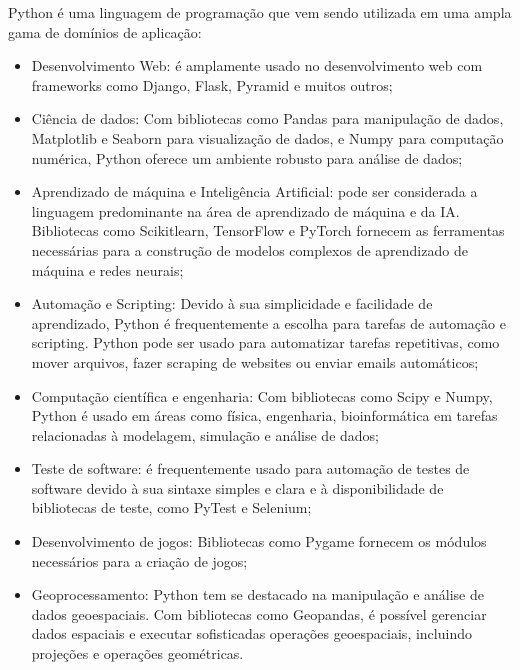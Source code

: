 \documentclass[letterpaper,10pt,english]{jupyterBook}
\begin{document}
\sphinxAtStartPar
{}

\sphinxAtStartPar
Python é uma linguagem de programação que vem sendo utilizada em uma ampla gama de domínios de aplicação:
\begin{itemize}
\item {} 
\sphinxAtStartPar
Desenvolvimento Web: é amplamente usado no desenvolvimento web com frameworks como Django, Flask, Pyramid e muitos outros;

\item {} 
\sphinxAtStartPar
Ciência de dados: Com bibliotecas como Pandas para manipulação de dados, Matplotlib e Seaborn para visualização de dados, e Numpy para computação numérica, Python oferece um ambiente robusto para análise de dados;

\item {} 
\sphinxAtStartPar
Aprendizado de máquina e Inteligência Artificial: pode ser considerada a linguagem predominante na área de aprendizado de máquina e da IA. Bibliotecas como Scikit\sphinxhyphen{}learn, TensorFlow e PyTorch fornecem as ferramentas necessárias para a construção de modelos complexos de aprendizado de máquina e redes neurais;

\item {} 
\sphinxAtStartPar
Automação e Scripting: Devido à sua simplicidade e facilidade de aprendizado, Python é frequentemente a escolha para tarefas de automação e scripting. Python pode ser usado para automatizar tarefas repetitivas, como mover arquivos, fazer scraping de websites ou enviar e\sphinxhyphen{}mails automáticos;

\item {} 
\sphinxAtStartPar
Computação científica e engenharia: Com bibliotecas como Scipy e Numpy, Python é usado em áreas como física, engenharia, bioinformática em tarefas relacionadas à modelagem, simulação e análise de dados;

\item {} 
\sphinxAtStartPar
Teste de software: é frequentemente usado para automação de testes de software devido à sua sintaxe simples e clara e à disponibilidade de bibliotecas de teste, como PyTest e Selenium;

\item {} 
\sphinxAtStartPar
Desenvolvimento de jogos: Bibliotecas como Pygame fornecem os módulos necessários para a criação de jogos;

\item {} 
\sphinxAtStartPar
Geoprocessamento: Python tem se destacado na manipulação e análise de dados geoespaciais. Com bibliotecas como Geopandas, é possível gerenciar dados espaciais e executar sofisticadas operações geoespaciais, incluindo projeções e operações geométricas.

\end{itemize}
\end{document}
